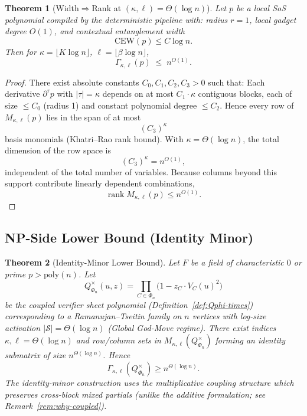 \documentclass[12pt]{article}
\newtheorem{theorem}{Theorem}
\theoremstyle{definition}
\theoremstyle{definition}
\theoremstyle{remark}
\theoremstyle{remark}
\begin{document}
\begin{theorem}[Width$\Rightarrow$Rank at $(\kappa,\ell)=\Theta(\log n)$]\label{thm:width-to-rank-formal}
Let $p$ be a local SoS polynomial compiled by the deterministic pipeline with:
radius $r=1$, local gadget degree $O(1)$, and contextual entanglement width
\[
\mathrm{CEW}(p) \leq C \log n.
\]
Then for $\kappa = \lfloor K \log n \rfloor$, $\ell = \lfloor \beta \log n \rfloor$,
\[
\Gamma_{\kappa,\ell}(p)
  \;\leq\;
  n^{O(1)}.
\]
\end{theorem}

\begin{proof}
There exist absolute constants $C_0, C_1, C_2, C_3 > 0$ such that:
Each derivative $\partial^\tau p$ with $|\tau|=\kappa$ depends on at most $C_1 \cdot \kappa$ contiguous blocks,
each of size $\le C_0$ (radius 1) and constant polynomial degree $\le C_2$.
Hence every row of $M_{\kappa,\ell}(p)$ lies in the span of at most
\[
(C_3)^\kappa
\]
basis monomials (Khatri--Rao rank bound).
With $\kappa = \Theta(\log n)$,
the total dimension of the row space is
\[
(C_3)^\kappa = n^{O(1)},
\]
independent of the total number of variables.
Because columns beyond this support contribute linearly dependent combinations,
\[
\operatorname{rank} M_{\kappa,\ell}(p) \leq n^{O(1)}.
\]
\end{proof}

\subsection{NP-Side Lower Bound (Identity Minor)}

\begin{theorem}[Identity-Minor Lower Bound]\label{thm:np-identity-minor-formal}
Let $F$ be a field of characteristic $0$ or prime $p > \mathrm{poly}(n)$. Let
\[
Q_{\Phi_n}^{\times}(u,z) = \prod_{C \in \Phi_n} \bigl(1 - z_C \cdot V_C(u)^2\bigr)
\]
be the \emph{coupled verifier sheet polynomial} (Definition~\ref{def:Qphi-times}) corresponding to a Ramanujan--Tseitin family on $n$ vertices with log-size activation $|\mathcal{S}| = \Theta(\log n)$ (Global God-Move regime).
There exist indices $\kappa,\ell = \Theta(\log n)$
and row/column sets in $M_{\kappa,\ell}(Q_{\Phi_n}^{\times})$
forming an identity submatrix of size $n^{\Theta(\log n)}$.
Hence
\[
\Gamma_{\kappa,\ell}(Q_{\Phi_n}^{\times}) \geq n^{\Theta(\log n)}.
\]
The identity-minor construction uses the multiplicative coupling structure which preserves cross-block mixed partials (unlike the additive formulation; see Remark~\ref{rem:why-coupled}).
\end{theorem}
\end{document}
